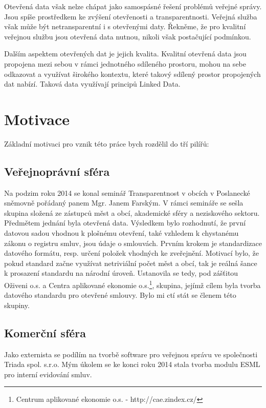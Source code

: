 Otevřená data však nelze chápat jako samospásné řešení problémů veřejné správy. Jsou spíše prostředkem ke zvýšení otevřenosti a transparentnosti. Veřejná služba však může být netransparentní i s otevřenými daty. Řekněme, že pro kvalitní veřejnou službu jsou otevřená data nutnou, nikoli však postačující podmínkou.

Dalším aspektem otevřených dat je jejich kvalita. Kvalitní otevřená data jsou propojena mezi sebou v rámci jednotného sdíleného prostoru, mohou na sebe odkazovat a využívat širokého kontextu, které takový sdílený prostor propojených dat nabízí. Taková data využívají principů Linked Data.

\section{Motivace}

Základní motivaci pro vznik této práce bych rozdělil do tří pilířů:

\subsection*{Veřejnoprávní sféra}

Na podzim roku 2014 se konal seminář Transparentnost v obcích v Poslanecké sněmovně pořádaný panem Mgr. Janem Farským. V rámci semináře se sešla skupina složená ze zástupců měst a obcí, akademické sféry a neziskového sektoru. Předmětem jednání byla otevřená data. Výsledkem bylo rozhodnutí, že první datovou sadou vhodnou k plošnému otevření, také vzhledem k chystanému zákonu o registru smluv, jsou údaje o smlouvách. Prvním krokem je standardizace datového formátu, resp. určení položek vhodných ke zveřejnění. Motivací bylo, že pokud standard začne využívat netriviální počet měst a obcí, tak je reálná šance k prosazení standardu na národní úroveň. Ustanovila se tedy, pod zášťitou Oživeni o.s. a Centra aplikované ekonomie o.s.\footnote{Centrum aplikované ekonomie o.s. - http://cae.zindex.cz/},  skupina, jejímž cílem byla tvorba datového standardu pro otevřené smlouvy. Bylo mi ctí stát se členem této skupiny.

\subsection*{Komerční sféra}

Jako externista se podílím na tvorbě software pro veřejnou správu ve společnosti Triada spol. s.r.o. Mým úkolem se ke konci roku 2014 stala tvorba modulu ESML pro interní evidování smluv.


